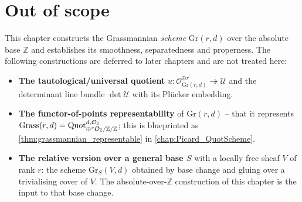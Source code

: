 \section{Out of scope}
\label{sec:gr_out_of_scope}

This chapter constructs the Grassmannian \emph{scheme} \(\mathrm{Gr}(r,d)\) over
the absolute base \(\mathbb{Z}\) and establishes its smoothness, separatedness
and properness. The following constructions are deferred to later chapters and
are not treated here:
\begin{itemize}
  \item \textbf{The tautological/universal quotient} \(u : \mathcal{O}^{\oplus
    r}_{\mathrm{Gr}(r,d)} \twoheadrightarrow \mathcal{U}\) and the determinant
    line bundle \(\det \mathcal{U}\) with its Pl\"ucker embedding.
  \item \textbf{The functor-of-points representability} of \(\mathrm{Gr}(r,d)\)
    -- that it represents \(\mathrm{Grass}(r,d) =
    \operatorname{Quot}^{d,\mathcal{O}_{\mathbb{Z}}}_{\oplus^r \mathcal{O}_{\mathbb{Z}} /
    \mathbb{Z} / \mathbb{Z}}\); this is blueprinted as
    \cref{thm:grassmannian_representable} in
    \cref{chap:Picard_QuotScheme}.
  \item \textbf{The relative version over a general base \(S\)} with a locally
    free sheaf \(V\) of rank \(r\): the scheme \(\mathrm{Gr}_S(V,d)\) obtained by
    base change and gluing over a trivialising cover of \(V\). The
    absolute-over-\(\mathbb{Z}\) construction of this chapter is the input to
    that base change.
\end{itemize}
